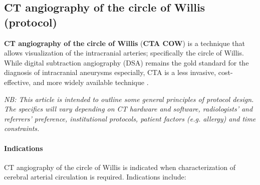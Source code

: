 \subsection{CT angiography of the circle of Willis (protocol)}

\textbf{CT angiography of the circle of Willis} (\textbf{CTA COW}) is a technique that allows visualization of the intracranial arteries; specifically the circle of Willis. While digital subtraction angiography (DSA) remains the gold standard for the diagnosis of intracranial aneurysms especially, CTA is a less invasive, cost-effective, and more widely available technique .

\emph{NB: This article is intended to outline some general principles of protocol design. The specifics will vary depending on CT hardware and software, radiologists' and referrers' preference, institutional protocols, patient factors (e.g. allergy) and time constraints.}

\paragraph{Indications}

CT angiography of the circle of Willis is indicated when characterization of cerebral arterial circulation is required. Indications include:

